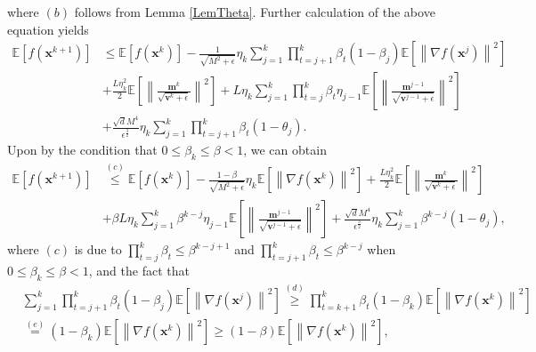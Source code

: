 \documentclass[twoside,11pt]{article}
\begin{document}
where $(b)$ follows from Lemma \ref{LemTheta}. Further calculation of the above equation yields
\begin{equation}\label{th1.22}
   	\begin{aligned}
   	\mathbb{E}\left[ f(\mathbf{x}^{k+1})\right]
   	&\le\mathbb{E}\left[ f(\mathbf{x}^k)\right] 
   	-\frac{1}{\sqrt{M^2+\epsilon}}\eta_k\sum_{j=1}^{k}\prod_{t=j+1}^{k}\beta_{t}(1-\beta_{j})\mathbb{E}\left[\left\| \nabla f(\mathbf{x}^j)\right\|^2\right]\\
   	&+\frac{L\eta_k^2}{2}\mathbb{E}\left[ \left\|  \frac{\mathbf{m}^k}{\sqrt{{\mathbf{v}}^k+\epsilon}}\right\| ^2\right]
   	+L\eta_k\sum_{j=1}^{k}\prod_{t=j}^{k}\beta_{t} \eta_{j-1}\mathbb{E}\left[\left\| \frac{ \mathbf{m}^{j-1}}{\sqrt{\mathbf{v}^{j-1}+\epsilon}}\right\|^2\right]\\
   	&+\frac{\sqrt{d}  M^4}{\epsilon^{\frac{3}{2}}}\eta_k\sum_{j=1}^{k}\prod_{t=j+1}^{k}\beta_{t}(1-\theta_j).\nonumber
   	\end{aligned}
\end{equation}
Upon by the condition that $0\le\beta_k\le\beta<1$, we can obtain
\begin{equation}\label{th1.17}
   	\begin{aligned}
   	\mathbb{E}\left[ f(\mathbf{x}^{k+1})\right]
   	&\overset{(c)}{\le}
   	\mathbb{E}\left[ f(\mathbf{x}^k)\right] 
   	-\frac{1-\beta}{\sqrt{M^2+\epsilon}}\eta_k\mathbb{E}\left[\left\| \nabla f(\mathbf{x}^k)\right\|^2\right]
   	+\frac{L\eta_k^2}{2}\mathbb{E}\left[ \left\|  \frac{\mathbf{m}^k}{\sqrt{{\mathbf{v}}^k+\epsilon}}\right\| ^2\right]\\
   	&+\beta L\eta_k\sum_{j=1}^{k}\beta^{k-j} \eta_{j-1}\mathbb{E}\left[\left\| \frac{ \mathbf{m}^{j-1}}{\sqrt{\mathbf{v}^{j-1}+\epsilon}}\right\|^2\right]
   	+\frac{\sqrt{d} M^4}{\epsilon^{\frac{3}{2}}}\eta_k\sum_{j=1}^{k}\beta^{k-j}(1-\theta_j) ,
   	\end{aligned}
\end{equation}
where $(c)$ is due to $\prod_{t=j}^{k}\beta_{t}\le\beta^{k-j+1}$ and $\prod_{t=j+1}^{k}\beta_{t}\le\beta^{k-j}$ when $0\le\beta_k\le\beta<1$, and the fact that
\begin{equation}
   	\begin{aligned}
   	&\sum_{j=1}^{k}\prod_{t=j+1}^{k}\beta_{t}(1-\beta_{j})\mathbb{E}\left[\left\| \nabla f(\mathbf{x}^j)\right\|^2\right]
   	\overset{(d)}{\ge}\prod_{t=k+1}^{k}\beta_{t}(1-\beta_k)\mathbb{E}\left[\left\| \nabla f(\mathbf{x}^k)\right\|^2\right]\\
    &	\overset{(e)}{=}(1-\beta_k)\mathbb{E}\left[\left\| \nabla f(\mathbf{x}^k)\right\|^2\right]
   	\ge(1-\beta)\mathbb{E}\left[\left\| \nabla f(\mathbf{x}^k)\right\|^2\right],\nonumber
   	\end{aligned}
\end{equation}
\end{document}
